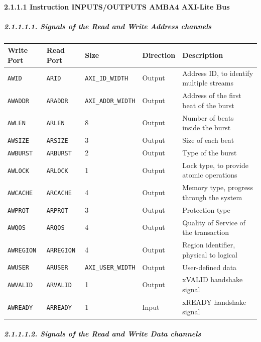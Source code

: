 \documentclass[
]{article}
\begin{document}
\hypertarget{instruction-inputsoutputs-amba4-axi-lite-bus-1}{%
\paragraph{2.1.1.1 Instruction INPUTS/OUTPUTS AMBA4 AXI-Lite
Bus}\label{instruction-inputsoutputs-amba4-axi-lite-bus-1}}

\hypertarget{signals-of-the-read-and-write-address-channels-2}{%
\subparagraph{2.1.1.1.1. Signals of the Read and Write Address
channels}\label{signals-of-the-read-and-write-address-channels-2}}

\begin{longtable}[]{@{}lllll@{}}
\toprule
Write Port & Read Port & Size & Direction & Description\tabularnewline
\midrule
\endhead
\texttt{AWID} & \texttt{ARID} & \texttt{AXI\_ID\_WIDTH} & Output &
Address ID, to identify multiple streams\tabularnewline
\texttt{AWADDR} & \texttt{ARADDR} & \texttt{AXI\_ADDR\_WIDTH} & Output &
Address of the first beat of the burst\tabularnewline
\texttt{AWLEN} & \texttt{ARLEN} & 8 & Output & Number of beats inside
the burst\tabularnewline
\texttt{AWSIZE} & \texttt{ARSIZE} & 3 & Output & Size of each
beat\tabularnewline
\texttt{AWBURST} & \texttt{ARBURST} & 2 & Output & Type of the
burst\tabularnewline
\texttt{AWLOCK} & \texttt{ARLOCK} & 1 & Output & Lock type, to provide
atomic operations\tabularnewline
\texttt{AWCACHE} & \texttt{ARCACHE} & 4 & Output & Memory type, progress
through the system\tabularnewline
\texttt{AWPROT} & \texttt{ARPROT} & 3 & Output & Protection
type\tabularnewline
\texttt{AWQOS} & \texttt{ARQOS} & 4 & Output & Quality of Service of the
transaction\tabularnewline
\texttt{AWREGION} & \texttt{ARREGION} & 4 & Output & Region identifier,
physical to logical\tabularnewline
\texttt{AWUSER} & \texttt{ARUSER} & \texttt{AXI\_USER\_WIDTH} & Output &
User-defined data\tabularnewline
\texttt{AWVALID} & \texttt{ARVALID} & 1 & Output & xVALID handshake
signal\tabularnewline
\texttt{AWREADY} & \texttt{ARREADY} & 1 & Input & xREADY handshake
signal\tabularnewline
\bottomrule
\end{longtable}

\hypertarget{signals-of-the-read-and-write-data-channels-2}{%
\subparagraph{2.1.1.1.2. Signals of the Read and Write Data
channels}\label{signals-of-the-read-and-write-data-channels-2}}
\end{document}
